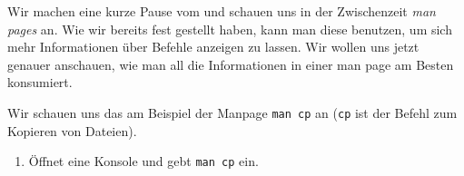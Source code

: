 
Wir machen eine kurze Pause vom \Cpp und schauen uns in der Zwischenzeit
\emph{man pages} an. Wie wir bereits fest gestellt haben, kann man diese
benutzen, um sich mehr Informationen über Befehle anzeigen zu lassen. Wir
wollen uns jetzt genauer anschauen, wie man all die Informationen in einer man
page am Besten konsumiert.

Wir schauen uns das am Beispiel der Manpage \texttt{man cp} an (\texttt{cp} ist
der Befehl zum Kopieren von Dateien).

\begin{praxis}
	\begin{enumerate}
		\item Öffnet eine Konsole und gebt \texttt{man cp} ein.
	\end{enumerate}
\end{praxis}

